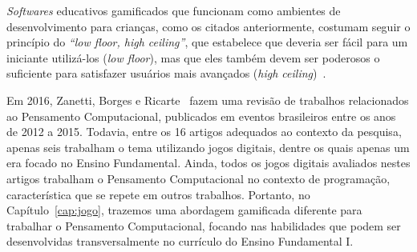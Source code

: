 \textit{Softwares} educativos gamificados que funcionam como ambientes de desenvolvimento para crianças, como os citados anteriormente, costumam seguir o princípio do \textit{“low floor, high ceiling”}, que estabelece que deveria ser fácil para um iniciante utilizá-los (\textit{low floor}), mas que eles também devem ser poderosos o suficiente para satisfazer usuários mais avançados (\textit{high ceiling})~\cite{grover_computational_2013}.

Em 2016, Zanetti, Borges e Ricarte~\cite{zanetti_pensamento_2016} fazem uma revisão de trabalhos relacionados ao Pensamento Computacional, publicados em eventos brasileiros entre os anos de 2012 a 2015. Todavia, entre os 16 artigos adequados ao contexto da pesquisa, apenas seis trabalham o tema utilizando jogos digitais, dentre os quais apenas um era focado no Ensino Fundamental. Ainda, todos os jogos digitais avaliados nestes artigos trabalham o Pensamento Computacional no contexto de programação, característica que se repete em outros trabalhos. Portanto, no Capítulo~\ref{cap:jogo}, trazemos uma abordagem gamificada diferente para trabalhar o Pensamento Computacional, focando nas habilidades que podem ser desenvolvidas transversalmente no currículo do Ensino Fundamental I.
